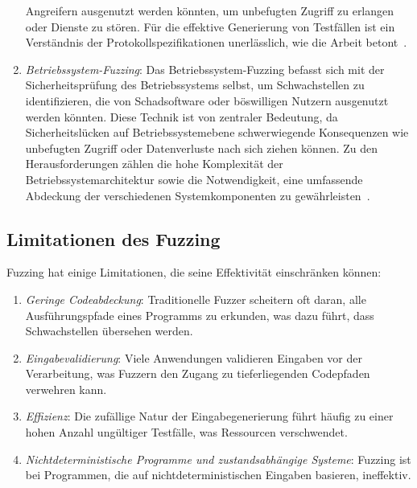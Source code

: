 \begin{enumerate}
    Angreifern ausgenutzt werden könnten, um unbefugten Zugriff zu erlangen oder Dienste zu stören.
    Für die effektive Generierung von Testfällen ist ein Verständnis der Protokollspezifikationen unerlässlich, wie die Arbeit
    betont~\cite{eceiza_fuzzing_2021}.
    \item \textit{Betriebssystem-Fuzzing}: Das Betriebssystem-Fuzzing befasst sich mit der Sicherheitsprüfung des Betriebssystems selbst, um Schwachstellen zu identifizieren,
    die von Schadsoftware oder böswilligen Nutzern ausgenutzt werden könnten.
    Diese Technik ist von zentraler Bedeutung, da Sicherheitslücken auf Betriebssystemebene schwerwiegende Konsequenzen wie
    unbefugten Zugriff oder Datenverluste nach sich ziehen können.
    Zu den Herausforderungen zählen die hohe Komplexität der Betriebssystemarchitektur sowie die Notwendigkeit, eine umfassende
    Abdeckung der verschiedenen Systemkomponenten zu gewährleisten~\cite{eceiza_fuzzing_2021}.
\end{enumerate}
\subsection{Limitationen des Fuzzing}\label{subsec:limitationen-des-fuzzign}
Fuzzing hat einige Limitationen, die seine Effektivität einschränken können:
\begin{enumerate}
    \item \textit{Geringe Codeabdeckung}: Traditionelle Fuzzer scheitern oft daran, alle Ausführungspfade eines Programms zu
    erkunden, was dazu führt, dass Schwachstellen übersehen werden.
    \item \textit{Eingabevalidierung}: Viele Anwendungen validieren Eingaben vor der Verarbeitung, was Fuzzern den Zugang zu
    tieferliegenden Codepfaden verwehren kann.
    \item \textit{Effizienz}: Die zufällige Natur der Eingabegenerierung führt häufig zu einer hohen Anzahl ungültiger Testfälle,
    was Ressourcen verschwendet.
    \item \textit{Nichtdeterministische Programme und zustandsabhängige Systeme}: Fuzzing ist bei Programmen, die auf
    nichtdeterministischen Eingaben basieren, ineffektiv.
\end{enumerate}
